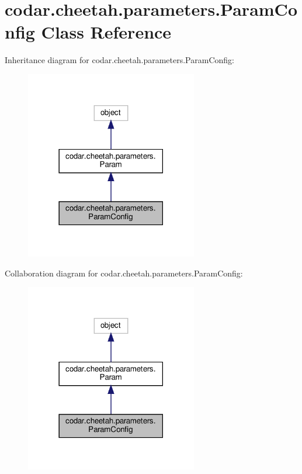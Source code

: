 \hypertarget{classcodar_1_1cheetah_1_1parameters_1_1_param_config}{}\section{codar.\+cheetah.\+parameters.\+Param\+Config Class Reference}
\label{classcodar_1_1cheetah_1_1parameters_1_1_param_config}


Inheritance diagram for codar.\+cheetah.\+parameters.\+Param\+Config\+:
\nopagebreak
\begin{figure}[H]
\begin{center}
\leavevmode
\includegraphics[width=213pt]{classcodar_1_1cheetah_1_1parameters_1_1_param_config__inherit__graph}
\end{center}
\end{figure}


Collaboration diagram for codar.\+cheetah.\+parameters.\+Param\+Config\+:
\nopagebreak
\begin{figure}[H]
\begin{center}
\leavevmode
\includegraphics[width=213pt]{classcodar_1_1cheetah_1_1parameters_1_1_param_config__coll__graph}
\end{center}
\end{figure}
